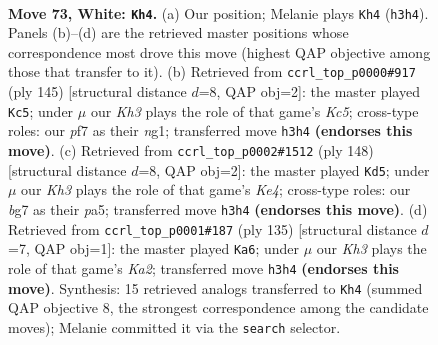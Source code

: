 \documentclass[11pt]{article}
\begin{document}
\clearpage

\begin{figure}[p]\centering
\begin{subfigure}{0.46\textwidth}\centering
\resizebox{\linewidth}{!}{%
\newchessgame
\chessboard[
  setfen={8/3k1pb1/8/1q6/8/7K/8/8 w - - 0 73},
  showmover=false,
  pgfstyle=straightmove, color=movearrow, markmove={h3-h4}
]}
\caption{}
\end{subfigure}\hfill
\begin{subfigure}{0.46\textwidth}\centering
\resizebox{\linewidth}{!}{%
\newchessgame
\chessboard[
  setfen={8/8/8/8/2k5/4K1Q1/8/6N1 b - - 0 73},
  showmover=false,
  pgfstyle=straightmove, color=movearrow, markmove={c4-c5}
]}
\caption{}
\end{subfigure}
\\[4pt]
\begin{subfigure}{0.46\textwidth}\centering
\resizebox{\linewidth}{!}{%
\newchessgame
\chessboard[
  setfen={5Q2/8/8/p7/P3K3/8/8/4k1q1 w - - 1 75},
  showmover=false,
  pgfstyle=straightmove, color=movearrow, markmove={e4-d5}
]}
\caption{}
\end{subfigure}\hfill
\begin{subfigure}{0.46\textwidth}\centering
\resizebox{\linewidth}{!}{%
\newchessgame
\chessboard[
  setfen={8/k7/8/8/1Q2K3/8/8/8 b - - 6 68},
  showmover=false,
  pgfstyle=straightmove, color=movearrow, markmove={a7-a6}
]}
\caption{}
\end{subfigure}
\caption{\textbf{Move 73, White: \texttt{Kh4}.} (a) Our position; Melanie plays \texttt{Kh4} (\texttt{h3h4}). Panels (b)--(d) are the retrieved master positions whose correspondence most drove this move (highest QAP objective among those that transfer to it). (b) Retrieved from \texttt{ccrl\_top\_p0000\#917} (ply 145) [structural distance $d$=8, QAP obj=2]: the master played \texttt{Kc5}; under $\mu$ our \emph{Kh3} plays the role of that game's \emph{Kc5}; cross-type roles: our \emph{p}f7 as their \emph{n}g1; transferred move \texttt{h3h4} \textbf{(endorses this move)}. (c) Retrieved from \texttt{ccrl\_top\_p0002\#1512} (ply 148) [structural distance $d$=8, QAP obj=2]: the master played \texttt{Kd5}; under $\mu$ our \emph{Kh3} plays the role of that game's \emph{Ke4}; cross-type roles: our \emph{b}g7 as their \emph{p}a5; transferred move \texttt{h3h4} \textbf{(endorses this move)}. (d) Retrieved from \texttt{ccrl\_top\_p0001\#187} (ply 135) [structural distance $d$=7, QAP obj=1]: the master played \texttt{Ka6}; under $\mu$ our \emph{Kh3} plays the role of that game's \emph{Ka2}; transferred move \texttt{h3h4} \textbf{(endorses this move)}. Synthesis: 15 retrieved analogs transferred to \texttt{Kh4} (summed QAP objective 8, the strongest correspondence among the candidate moves); Melanie committed it via the \texttt{search} selector.}
\label{fig:thought-m144}
\end{figure}
\end{document}
